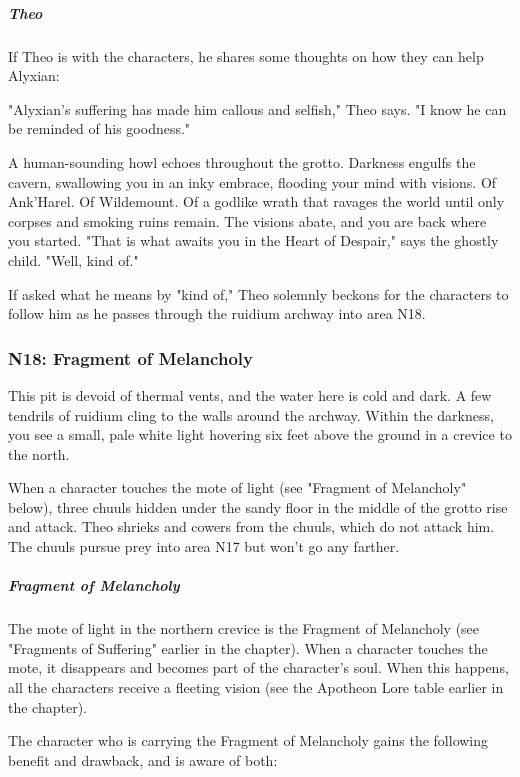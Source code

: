 \documentclass[10pt,a4paper,twoside,fancy,bg=print,twocolumn,openany,nodeprecatedcode]{dndbook}
\begin{document}
\subparagraph{Theo}
If Theo is with the characters, he shares some thoughts on how they can help Alyxian:

\begin{DndReadAloud}{}
"Alyxian's suffering has made him callous and selfish," Theo says. "I know he can be reminded of his goodness."

A human-sounding howl echoes throughout the grotto. Darkness engulfs the cavern, swallowing you in an inky embrace, flooding your mind with visions. Of Ank'Harel. Of Wildemount. Of a godlike wrath that ravages the world until only corpses and smoking ruins remain. The visions abate, and you are back where you started. "That is what awaits you in the Heart of Despair," says the ghostly child. "Well, kind of."

\end{DndReadAloud}

If asked what he means by "kind of," Theo solemnly beckons for the characters to follow him as he passes through the ruidium archway into area N18.

\subsubsection{N18: Fragment of Melancholy}
\begin{DndReadAloud}{}
This pit is devoid of thermal vents, and the water here is cold and dark. A few tendrils of ruidium cling to the walls around the archway. Within the darkness, you see a small, pale white light hovering six feet above the ground in a crevice to the north.

\end{DndReadAloud}

When a character touches the mote of light (see "Fragment of Melancholy" below), three chuuls hidden under the sandy floor in the middle of the grotto rise and attack. Theo shrieks and cowers from the chuuls, which do not attack him. The chuuls pursue prey into area N17 but won't go any farther.

\subparagraph{Fragment of Melancholy}
The mote of light in the northern crevice is the Fragment of Melancholy (see "Fragments of Suffering" earlier in the chapter). When a character touches the mote, it disappears and becomes part of the character's soul. When this happens, all the characters receive a fleeting vision (see the Apotheon Lore table earlier in the chapter).

The character who is carrying the Fragment of Melancholy gains the following benefit and drawback, and is aware of both:
\end{document}
